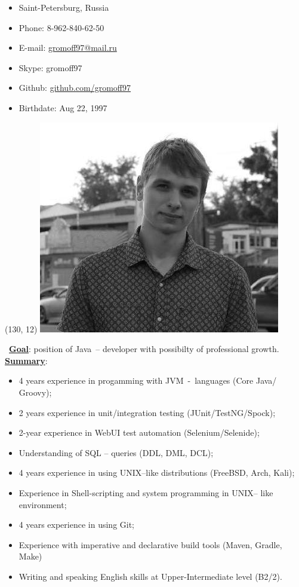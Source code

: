 \documentclass[hidelinks,12pt,a4paper,oneside]{article}
\newcommand*\ruleline[1]{\par\noindent\raisebox{.8ex}{\makebox[\linewidth]{\hrulefill\hspace{1ex}\raisebox{-.8ex}{#1}\hspace{1ex}\hrulefill}}}
\newcommand*\simpleruleline[1]{\par\noindent\raisebox{.8ex}{\makebox[\linewidth]{\hrulefill\hspace{#1}}}}
\newcommand*\tqs{\textquotesingle}
\begin{document}
%
%
%
%
\thispagestyle{empty}
{ \LARGE \ruleline{Anton Gromov} }
{\large
\begin{itemize}[topsep=5pt, itemsep=-11pt]
	\item[] Saint-Petersburg, Russia
	\item[] Phone: 8-962-840-62-50
	\item[] E-mail: \href{mailto://gromoff97@mail.ru}{gromoff97@mail.ru}
	\item[] Skype: gromoff97
	\item[] Github: \href{https://github.com/gromoff97}{github.com/gromoff97}
	\item[] Birthdate: Aug 22, 1997
\end{itemize}
\simpleruleline{1ex}
}
\begin{textblock}{20}(130, 12)
	\includegraphics[scale=0.30]{myphoto.jpg}
\end{textblock}
\
{\Large \underline{\textbf{Goal}}}: {\large position of \tqs Java\tqs\ -- developer with possibilty of professional growth.} \\[3px]
{\Large \underline{\textbf{Summary}}}: 
{\large
\begin{itemize}[noitemsep]
	\item 4 years experience in progamming with JVM\ -\ languages (Core \tqs Java\tqs /  \tqs Groovy\tqs);
	\item 2 years experience in unit/integration testing (\tqs JUnit\tqs/\tqs TestNG\tqs/\tqs Spock\tqs);
	\item 2-year experience in WebUI test automation (\tqs Selenium\tqs/\tqs Selenide\tqs);
	\item Understanding of SQL – queries (DDL, DML, DCL);
	\item 4 years experience in using \tqs UNIX\tqs --like distributions (\tqs FreeBSD\tqs, \tqs Arch\tqs, \tqs Kali\tqs);
	\item Experience in Shell-scripting and system programming in \tqs UNIX\tqs -- like environment;
	\item 4 years experience in using \tqs Git\tqs;
	\item Experience with imperative and declarative build tools (\tqs Maven\tqs, \tqs Gradle\tqs, \tqs Make\tqs)
	\item Writing and speaking English skills at Upper-Intermediate level (B2/2).
\end{itemize}}
\end{document}
